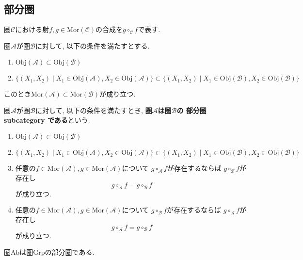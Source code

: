 \subsection{部分圏}
\begin{Notation}
圏$\mathscr{C}$における射$f,g\in\mathrm{Mor}(\mathscr{C})$の合成を$g\circ_{\mathscr{C}}f$で表す.
\end{Notation}
\begin{Prop}
圏$\mathscr{A}$が圏$\mathscr{B}$に対して, 以下の条件を満たすとする.
\begin{enumerate}
\item
$\mathrm{Obj}(\mathscr{A})\subset\mathrm{Obj}(\mathscr{B})$
\item
$\{(X_1,X_2)\mid X_1\in\mathrm{Obj}(\mathscr{A}),X_2\in \mathrm{Obj}(\mathscr{A})\}
\subset
\{(X_1,X_2)\mid X_1\in\mathrm{Obj}(\mathscr{B}),X_2\in \mathrm{Obj}(\mathscr{B})\}
$
\end{enumerate}
このとき$\mathrm{Mor}(\mathscr{A})\subset\mathrm{Mor}(\mathscr{B})$が成り立つ.
\end{Prop}
\begin{comment}
\begin{proof}
\end{proof}
\end{comment}

\begin{Def}
圏$\mathscr{A}$が圏$\mathscr{B}$に対して, 以下の条件を満たすとき, {\bf 圏$\mathscr{A}$は圏$\mathscr{B}$の
部分圏 subcategory
である}という.
\begin{enumerate}
\item
$\mathrm{Obj}(\mathscr{A})\subset\mathrm{Obj}(\mathscr{B})$
\item
$\{(X_1,X_2)\mid X_1\in\mathrm{Obj}(\mathscr{A}),X_2\in \mathrm{Obj}(\mathscr{A})\}
\subset
\{(X_1,X_2)\mid X_1\in\mathrm{Obj}(\mathscr{B}),X_2\in \mathrm{Obj}(\mathscr{B})\}
$
\item 任意の$f\in\mathrm{Mor}(\mathscr{A}), g\in\mathrm{Mor}(\mathscr{A})$について
$g\circ_{\mathscr{A}}f$が存在するならば
$g\circ_{\mathscr{B}}f$が存在し
\[
g\circ_{\mathscr{A}}f=g\circ_{\mathscr{B}}f
\]
が成り立つ.
\item 任意の$f\in\mathrm{Mor}(\mathscr{A}), g\in\mathrm{Mor}(\mathscr{A})$について
$g\circ_{\mathscr{B}}f$が存在するならば
$g\circ_{\mathscr{A}}f$が存在し
\[
g\circ_{\mathscr{A}}f=g\circ_{\mathscr{B}}f
\]
が成り立つ.
\end{enumerate}
\end{Def}
\begin{Prop}
圏$\mathrm{Ab}$は圏$\mathrm{Grp}$の部分圏である.
\end{Prop}
\begin{comment}
\begin{proof}
\end{proof}
\end{comment}

